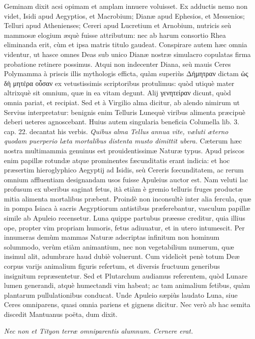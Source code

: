 \documentclass[a4paper, 11pt, oneside, polutonikogreek, latin]{article}
\begin{document}
Geminam dixit acsi opimam et amplam innuere voluisset. Ex adductis nemo non videt, Isidi apud Aegyptios, et Macrobium; Dianæ apud Ephesios, et Messenios; Telluri apud Athenienses; Cereri apud Lucretium et Arnobium, nutricis seù mammosæ elogium æquè fuisse attributum: nec ab harum consortio Rhea eliminanda erit, cùm et ipsa matris titulo gaudeat. Conspirare autem hæc omnia videntur, ut hasce omnes Deas sub unico Dianæ nostræ simulacro copulatas firma probatione retinere possimus. Atqui non indecenter Diana, seù mauis Ceres Polymamma à priscis illis mythologis efficta, quàm superiùs Δήμητραν dictam ὡς δὴ μητέρα οὖσαν ex vetustissimis scriptoribus protulimus: quòd utiquè mater altrixquè sit omnium, quæ in ea vitam degunt. Alij γενητείραν dicunt, quòd omnia pariat, et recipiat. Sed et à Virgilio alma dicitur, ab alendo nimirum ut Servius interpretatur: benignis enim Telluris Lunequè viribus alimenta præcipuè deberi ueteres agnoscebant. Huius autem singularia beneficia Columella lib. 3. cap. 22. decantat his verbis. \emph{Quibus alma Tellus annua vite, væluti æterno quodam puerperio læta mortalibus distenta musto dimittit ubera.} Cæterum hæc nostra multimammia genuinus est prouidentissimæ Naturæ typus. Apud priscos enim papillæ rotundæ atque prominentes fæcunditatis erant indicia: et hoc præsertim hieroglyphico Aegyptij ad Isidis, seù Cereris fœcunditatem, ac rerum omnium affluentiam designandam usos fuisse Apuleius auctor est. Nam veluti lac profusum ex uberibus saginat fetus, ità etiàm è gremio telluris fruges productæ mitia alimenta mortalibus præbent. Proindè non inconsultè inter alia fercula, quæ in pompa Isiaca à sacris Aegyptiorum antistibus præferebantur, vasculum papillæ simile ab Apuleio recensetur. Luna quippe partubus præesse creditur, quia illius ope, propter vim propriam humoris, fetus adiuuatur, et in utero intumescit. Per innumeras demùm mammas Naturæ adscriptas infinitum non hominum solummodo, verùm etiàm animantium, nec non vegetabilium numerum, quæ insimul alit, adumbrare haud dubiè voluerunt. Cum videlicèt penè totum Deæ corpus varijs animalium figuris refertum, et diversis fructuum generibus insignitum repræsentetur. Sed et Plutarchum audiamus referentem, quòd Lunare lumen generandi, atquè humectandi vim habeat; ac tam animalium fetibus, quàm plantarum pullulationibus conducat. Unde Apuleio sæpiùs laudato Luna, siue Ceres omniparens, quasi omnia pariens et gignens dicitur. Nec verò ab hac semita discedit Mantuanus poëta, dum dixit.

\emph{Nec non et Tityon terræ omniparentis alumnum.}
\emph{Cernere erat.}
\end{document}
